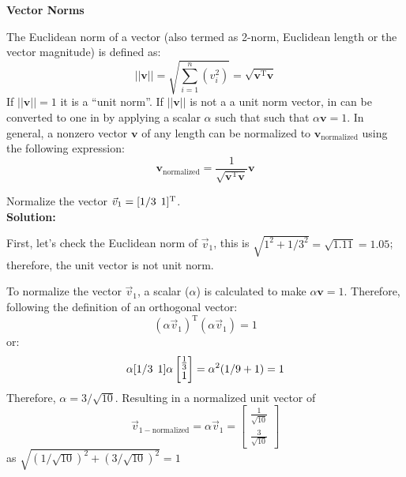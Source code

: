 \documentclass[12pt,letter]{article}
\begin{document}
	
		\begin{review}	
		\textbf{Vector Norms} 
		
	The Euclidean norm of a vector (also termed as 2-norm, Euclidean length or the vector magnitude) is defined as:
	\begin{equation}
	||\textbf{v}|| = \sqrt{\sum_{i=1}^{n}(v_i^2)} = \sqrt{\textbf{v}^{\text{T}}\textbf{v}}
	\end{equation} 
	If $||\textbf{v}|| = 1$ it is a ``unit norm''. If $||\textbf{v}||$ is not a a unit norm vector, in can be converted to one in by applying a scalar $\alpha$ such that such that $\alpha\textbf{v}=1$. In general, a nonzero vector $\textbf{v}$ of any length can be normalized to $\textbf{v}_\text{normalized}$ using the following expression:
		\begin{equation}
		\textbf{v}_\text{normalized} = \frac{1}{\sqrt{\textbf{v}^{\text{T}}\textbf{v}} } \textbf{v}
		\end{equation}
	\end{review}	

	
	
	 
	
	\begin{example}
	\label{ex:vector_normalizeation}
	Normalize the vector $\vec{v}_1=[1/3 \hspace{1ex} 1]^\text{T}$. \\
	
\noindent \textbf{Solution:} 

First, let's check the Euclidean norm of $\vec{v}_1$, this is $\sqrt{1^2+1/3^2} = \sqrt{1.11} = 1.05$; therefore, the unit vector is not unit norm.
	
	To normalize the vector $\vec{v}_1$, a scalar ($\alpha$) is calculated to make $\alpha\textbf{v}=1$.  Therefore, following the definition of an orthogonal vector:
	\begin{equation}
	(\alpha \vec{v}_1)^\text{T}(\alpha \vec{v}_1) = 1
	\end{equation}
	or:
	\begin{equation}
	\alpha [1/3 \hspace{1ex} 1]\alpha  \begin{bmatrix} \frac{1}{3}\\  1 \end{bmatrix}  = \alpha^2(1/9+1) = 1
	\end{equation}
	Therefore, $\alpha=3/\sqrt{10}$. Resulting in a normalized unit vector of
	\begin{equation}
		\vec{v}_{1-\text{normalized}} = \alpha\vec{v}_1= \begin{bmatrix} \frac{1}{\sqrt{10}}\\  \frac{3}{\sqrt{10}} \end{bmatrix}
		\end{equation}
		 as $\sqrt{(1/\sqrt{10})^2 + (3/\sqrt{10})^2} =1$
	
	\end{example}	
	
\end{document}
